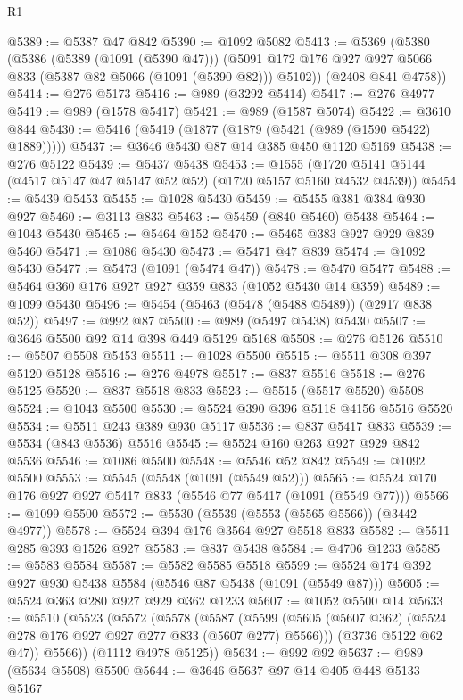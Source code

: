 \begin{lexlean}{R1}
\begin{coremodule}
@5389 := @5387 @47 @842
@5390 := @1092 @5082
@5413 := @5369
    (@5380
      (@5386
        (@5389 (@1091 (@5390 @47)))
        (@5091 @172 @176 @927 @927 @5066 @833 (@5387 @82 @5066 (@1091 (@5390 @82))) @5102))
      (@2408 @841 @4758))
@5414 := @276 @5173
@5416 := @989 (@3292 @5414)
@5417 := @276 @4977
@5419 := @989 (@1578 @5417)
@5421 := @989 (@1587 @5074)
@5422 := @3610 @844
@5430 := @5416 (@5419 (@1877 (@1879 (@5421 (@989 (@1590 @5422) @1889)))))
@5437 := @3646 @5430 @87 @14 @385 @450 @1120 @5169
@5438 := @276 @5122
@5439 := @5437 @5438
@5453 := @1555 (@1720 @5141 @5144 (@4517 @5147 @47 @5147 @52 @52) (@1720 @5157 @5160 @4532 @4539))
@5454 := @5439 @5453
@5455 := @1028 @5430
@5459 := @5455 @381 @384 @930 @927
@5460 := @3113 @833
@5463 := @5459 (@840 @5460) @5438
@5464 := @1043 @5430
@5465 := @5464 @152
@5470 := @5465 @383 @927 @929 @839 @5460
@5471 := @1086 @5430
@5473 := @5471 @47 @839
@5474 := @1092 @5430
@5477 := @5473 (@1091 (@5474 @47))
@5478 := @5470 @5477
@5488 := @5464 @360 @176 @927 @927 @359 @833 (@1052 @5430 @14 @359)
@5489 := @1099 @5430
@5496 := @5454 (@5463 (@5478 (@5488 @5489)) (@2917 @838 @52))
@5497 := @992 @87
@5500 := @989 (@5497 @5438) @5430
@5507 := @3646 @5500 @92 @14 @398 @449 @5129 @5168
@5508 := @276 @5126
@5510 := @5507 @5508 @5453
@5511 := @1028 @5500
@5515 := @5511 @308 @397 @5120 @5128
@5516 := @276 @4978
@5517 := @837 @5516
@5518 := @276 @5125
@5520 := @837 @5518 @833
@5523 := @5515 (@5517 @5520) @5508
@5524 := @1043 @5500
@5530 := @5524 @390 @396 @5118 @4156 @5516 @5520
@5534 := @5511 @243 @389 @930 @5117
@5536 := @837 @5417 @833
@5539 := @5534 (@843 @5536) @5516
@5545 := @5524 @160 @263 @927 @929 @842 @5536
@5546 := @1086 @5500
@5548 := @5546 @52 @842
@5549 := @1092 @5500
@5553 := @5545 (@5548 (@1091 (@5549 @52)))
@5565 := @5524 @170 @176 @927 @927 @5417 @833 (@5546 @77 @5417 (@1091 (@5549 @77)))
@5566 := @1099 @5500
@5572 := @5530 (@5539 (@5553 (@5565 @5566)) (@3442 @4977))
@5578 := @5524 @394 @176 @3564 @927 @5518 @833
@5582 := @5511 @285 @393 @1526 @927
@5583 := @837 @5438
@5584 := @4706 @1233
@5585 := @5583 @5584
@5587 := @5582 @5585 @5518
@5599 := @5524 @174 @392 @927 @930 @5438 @5584 (@5546 @87 @5438 (@1091 (@5549 @87)))
@5605 := @5524 @363 @280 @927 @929 @362 @1233
@5607 := @1052 @5500 @14
@5633 := @5510
    (@5523
      (@5572
        (@5578
          (@5587
            (@5599 (@5605 (@5607 @362) (@5524 @278 @176 @927 @927 @277 @833 (@5607 @277) @5566)))
            (@3736 @5122 @62 @47))
          @5566))
      (@1112 @4978 @5125))
@5634 := @992 @92
@5637 := @989 (@5634 @5508) @5500
@5644 := @3646 @5637 @97 @14 @405 @448 @5133 @5167

\end{coremodule}
\end{lexlean}
